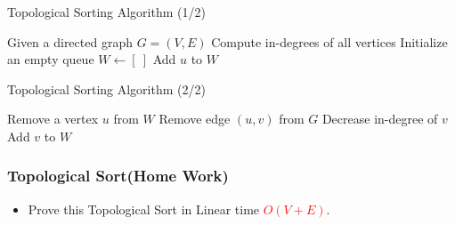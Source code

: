 \begin{frame}{Topological Sorting Algorithm (1/2)}
    \footnotesize
    \begin{algorithm}[H]
        \caption{Topological Sorting (TS)}
        \begin{algorithmic}[1]
            \State Given a directed graph $G = (V, E)$
            \State Compute in-degrees of all vertices
            \State Initialize an empty queue $W \gets [\ ]$
                    \State Add $u$ to $W$
                \EndIf
            \EndFor
            
        \end{algorithmic}
    \end{algorithm}
\end{frame}


\begin{frame}{Topological Sorting Algorithm (2/2)}
    \footnotesize
    \begin{algorithm}[H]
        \caption{Topological Sorting (TS) - Continued}
        \begin{algorithmic}[1]
                \State Remove a vertex $u$ from $W$
                    \State Remove edge $(u, v)$ from $G$
                    \State Decrease in-degree of $v$
                        \State Add $v$ to $W$
                    \EndIf
                \EndFor
            \EndWhile
        \end{algorithmic}
    \end{algorithm}
\end{frame}


\begin{frame}
     \frametitle{\textbf{Topological Sort(Home Work)}}
      \begin{itemize}
        \item Prove this Topological Sort in Linear time \textbf{\textcolor{red}{\(O(V + E)\)}}.
    \end{itemize}
\end{frame}